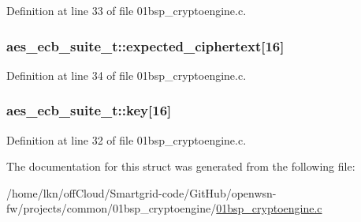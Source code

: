 Definition at line 33 of file 01bsp\+\_\+cryptoengine.\+c.

\subsubsection[{\texorpdfstring{expected\+\_\+ciphertext}{expected_ciphertext}}]{ aes\+\_\+ecb\+\_\+suite\+\_\+t\+::expected\+\_\+ciphertext\mbox{[}16\mbox{]}}\hypertarget{structaes__ecb__suite__t_a62ced811c4dbadab25cf16e6fb73b9c5}{}\label{structaes__ecb__suite__t_a62ced811c4dbadab25cf16e6fb73b9c5}


Definition at line 34 of file 01bsp\+\_\+cryptoengine.\+c.

\subsubsection[{\texorpdfstring{key}{key}}]{ aes\+\_\+ecb\+\_\+suite\+\_\+t\+::key\mbox{[}16\mbox{]}}\hypertarget{structaes__ecb__suite__t_a1b2b0f6423dcd259e72ca0f9e14ddc24}{}\label{structaes__ecb__suite__t_a1b2b0f6423dcd259e72ca0f9e14ddc24}


Definition at line 32 of file 01bsp\+\_\+cryptoengine.\+c.



The documentation for this struct was generated from the following file\+:\begin{DoxyCompactItemize}
\item 
/home/lkn/off\+Cloud/\+Smartgrid-\/code/\+Git\+Hub/openwsn-\/fw/projects/common/01bsp\+\_\+cryptoengine/\hyperlink{01bsp__cryptoengine_8c}{01bsp\+\_\+cryptoengine.\+c}\end{DoxyCompactItemize}
